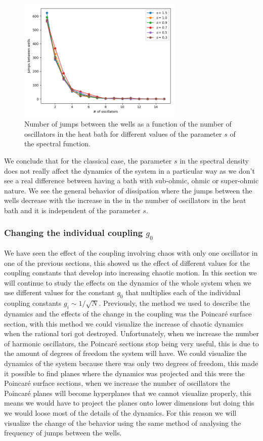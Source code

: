 \begin{figure}[H]
\centering
\includegraphics[width=0.7\textwidth]{Figures/change_s_number.png}
\caption{Number of jumps between the wells as a function of the number of oscillators in the heat bath for different values of the parameter $s$ of the spectral function.
}
\label{fig:changing_s}
\end{figure} 

We conclude that for the classical case, the parameter $s$ in the spectral density does not really affect the dynamics of the system in a particular way as we don't see a real difference between having a bath with sub-ohmic, ohmic or super-ohmic nature. We see the general behavior of dissipation where the jumps between the wells decrease with the increase in the in the number of oscillators in the heat bath and it is independent of the parameter $s$.

\subsubsection{Changing the individual coupling $g_0$}
We have seen the effect of the coupling involving chaos with only one oscillator in one of the previous sections, this showed us the effect of different values for the coupling constants that develop into increasing chaotic motion. In this section we will continue to study the effects on the dynamics of the whole system when we use different values for the constant $g_0$ that multiplies each of the individual coupling constants $g_i \sim 1/\sqrt{N}$. Previously, the method we used to describe the dynamics and the effects of the change in the coupling was the Poincaré surface section, with this method we could visualize the increase of chaotic dynamics when the rational tori got destroyed. Unfortunately, when we increase the number of harmonic oscillators, the Poincaré sections stop being very useful, this is due to the amount of degrees of freedom the system will have. We could visualize the dynamics of the system because there was only two degrees of freedom, this made it possible to find planes where the dynamics was projected and this were the Poincaré surface sections, when we increase the number of oscillators the Poincaré planes will become hyperplanes that we cannot visualize properly, this means we would have to project the planes onto lower dimensions but doing this we would loose most of the details of the dynamics. For this reason we will visualize the change of the behavior using the same method of analysing the frequency of jumps between the wells.\par 


